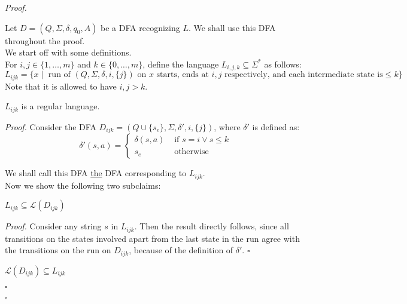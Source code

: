 \documentclass[a4paper]{article}
\newenvironment{proof}{\begin{breakbox}\textit{Proof.}}{\hfill$\square$\end{breakbox}}
\newcommand{\mc}{\mathcal}
\renewcommand{\L}{\mc{L}}
\begin{document}
\begin{proof}

    Let $D = (Q, \Sigma, \delta, q_0, A)$ be a DFA recognizing $L$. We shall use this DFA throughout the proof.\\

    We start off with some definitions.\\

    For $i, j \in \{1, \ldots, m\}$ and $k \in \{0, \ldots, m\}$, define the language $L_{i, j, k} \subseteq \Sigma^*$ as follows:
    \[
        L_{ijk} = \{x \mid \text{ run of } (Q, \Sigma, \delta, i, \{j\}) \text{ on } x \text{ starts, ends at } i, j \text{ respectively, and each intermediate state is} \le k \}
    \]
    Note that it is allowed to have $i, j > k$.\\

    \begin{claim}
        $L_{ijk}$ is a regular language.
    \end{claim}

    \begin{proof}
        Consider the DFA $D_{ijk} = (Q \cup \{s_e\}, \Sigma, \delta', i, \{j\})$, where $\delta'$ is defined as:
        \[
        \delta'(s, a) = \begin{cases}
            \delta(s, a) & \text{ if } s = i \lor s \le k\\
            s_e & \text{ otherwise}
        \end{cases}
        \]
        
        We shall call this DFA \underline{the} DFA corresponding to $L_{ijk}$.\\

        Now we show the following two subclaims:\\

        \begin{claim}
            $L_{ijk} \subseteq \L(D_{ijk})$
        \end{claim}

        \begin{proof}
            Consider any string $s$ in $L_{ijk}$. Then the result directly follows, since all transitions on the states involved apart from the last state in the run agree with the transitions on the
            run on $D_{ijk}$, because of the definition of $\delta'$.
        \end{proof}

        \begin{claim}
            $\L(D_{ijk}) \subseteq L_{ijk}$
        \end{claim}


\end{proof}
\end{proof}
\end{document}
